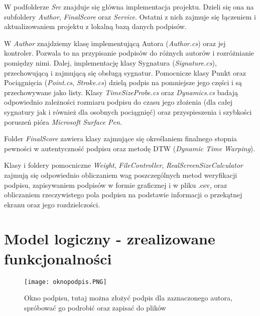 \documentclass[notitlepage, oneside]{report}
\begin{document}
 W podfolderze \textit{Src} znajduje się główna implementacja projektu. Dzieli się ona na subfoldery \textit{Author}, \textit{FinalScore} oraz \textit{Service}. Ostatni z nich zajmuje się łączeniem i aktualizowaniem projektu z lokalną bazą danych podpisów.
 
 W  \textit{Author} znajdziemy klasę implementującą Autora (\textit{Author.cs}) oraz jej kontroler. Pozwala to na przypisanie podpisów do różnych autorów i rozróżnianie pomiędzy nimi. Dalej, implementację klasy Sygnatura (\textit{Signature.cs}), przechowującą i zajmującą się obsługą sygnatur. Pomocnicze klasy Punkt oraz Pociągnięcia (\textit{Point.cs}, \textit{Stroke.cs}) dzielą podpis na pomniejsze jego części i są przechowywane jako listy. Klasy \textit{TimeSizeProbe.cs} oraz \textit{Dynamics.cs} badają odpowiednio zależności rozmiaru podpisu do czasu jego złożenia (dla całej sygnatury jak i również dla osobnych pociągnięć) oraz przyspieszenia i szybkości poruszeń pióra \textit{Microsoft Surface Pen}.
 
   Folder \textit{FinalScore} zawiera klasy zajmujące się określaniem finalnego stopnia pewności w autentyczność podpisu oraz metodę DTW (\textit{Dynamic Time Warping}).
   
    Klasy i foldery pomocniczne \textit{Weight}, \textit{FileController}, \textit{RealScreenSizeCalculator} zajmują się odpowiednio obliczaniem wag poszczególnych metod weryfikacji podpisu, zapisywaniem podpisów w formie graficznej i w pliku .csv, oraz obliczaniem rzeczywistego pola podpisu na podstawie informacji o przekątnej ekranu oraz jego rozdzielczości.
    



\chapter*{Model logiczny - zrealizowane funkcjonalności}

\begin{figure}
\centering
\texttt{[image: oknopodpis.PNG]}
\caption{Okno podpisu, tutaj można złożyć podpis dla zaznaczonego autora, spróbować go podrobić oraz zapisać do plików}
\label{rys:Okno podpisu w aplikacji}
\end{figure}
\end{document}
